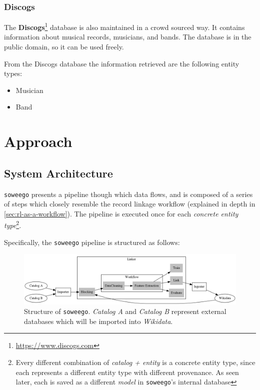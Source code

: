 \documentclass[epsfig,a4paper,11pt,titlepage,twoside,openany]{book}
\newcommand{\footurl}[1]{\footnote{\url{#1}}}
\begin{document}
\subsection{Discogs}
\label{sec:catalog-discogs}


The \textbf{Discogs}\footurl{https://www.discogs.com} database is also maintained in a crowd sourced way. It contains information about musical records, musicians, and bands. The database is in the public domain, so it can be used freely.

From the Discogs database the information retrieved are the following entity types:

\begin{itemize}
\item Musician
\item Band
\end{itemize}


\chapter{Approach}
\label{chap:apprach}


\section{System Architecture}
\label{sec:system-architecture}


\texttt{soweego} presents a pipeline though which data flows, and is composed of a series of steps which closely resemble the record linkage workflow (explained in depth in \autoref{sec:rl-as-a-workflow}). The pipeline is executed once for each \textit{concrete entity type}\footnote{Every different combination of \textit{catalog + entity}  is a concrete entity type, since each represents a different entity type with different provenance. As seen later, each is saved as a different \textit{model} in \texttt{soweego}'s internal database}.

Specifically, the \texttt{soweego} pipeline is structured as follows:

\begin{figure}[H]
  \centering \includegraphics[width=\textwidth]{soweego_structure}
  \caption{Structure of \texttt{soweego}. \textit{Catalog A} and \textit{Catalog
      B} represent external databases which will be imported into
    \textit{Wikidata}.}
  \label{fig:soweego-structure}
\end{figure}
\end{document}
